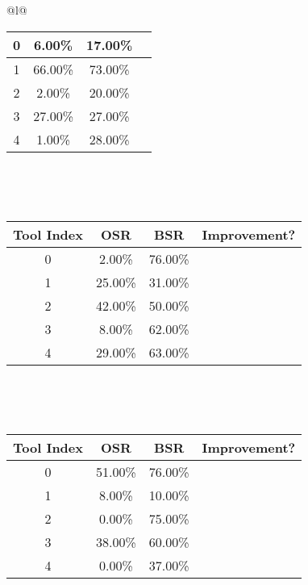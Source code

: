 \begin{longtable}{@{}l@{}}
\begin{minipage}{\textwidth}
\begin{tabular}{|c|c|c|c|}
0 & 6.00\% & 17.00\% & \textcolor{green}{\ding{51}} \\ \hline
1 & 66.00\% & 73.00\% & \textcolor{green}{\ding{51}} \\ \hline
2 & 2.00\% & 20.00\% & \textcolor{green}{\ding{51}} \\ \hline
3 & 27.00\% & 27.00\% & \textcolor{red}{\ding{55}} \\ \hline
4 & 1.00\% & 28.00\% & \textcolor{green}{\ding{51}} \\ \hline
\end{tabular}
\end{minipage}\\[2ex]
\begin{minipage}{\textwidth}
\centering\vspace{2ex}
\\[0.8ex]
\begin{tabular}{|c|c|c|c|} \hline
\textbf{Tool Index} & \textbf{OSR} & \textbf{ BSR} & \textbf{Improvement?} \\ \hline
0 & 2.00\% & 76.00\% & \textcolor{green}{\ding{51}} \\ \hline
1 & 25.00\% & 31.00\% & \textcolor{green}{\ding{51}} \\ \hline
2 & 42.00\% & 50.00\% & \textcolor{green}{\ding{51}} \\ \hline
3 & 8.00\% & 62.00\% & \textcolor{green}{\ding{51}} \\ \hline
4 & 29.00\% & 63.00\% & \textcolor{green}{\ding{51}} \\ \hline
\end{tabular}
\end{minipage}\\[2ex]
\begin{minipage}{\textwidth}
\centering\vspace{2ex}
\\[0.8ex]
\begin{tabular}{|c|c|c|c|} \hline
\textbf{Tool Index} & \textbf{OSR} & \textbf{ BSR} & \textbf{Improvement?} \\ \hline
0 & 51.00\% & 76.00\% & \textcolor{green}{\ding{51}} \\ \hline
1 & 8.00\% & 10.00\% & \textcolor{green}{\ding{51}} \\ \hline
2 & 0.00\% & 75.00\% & \textcolor{green}{\ding{51}} \\ \hline
3 & 38.00\% & 60.00\% & \textcolor{green}{\ding{51}} \\ \hline
4 & 0.00\% & 37.00\% & \textcolor{green}{\ding{51}} \\ \hline

\end{tabular}
\end{minipage}
\end{longtable}
